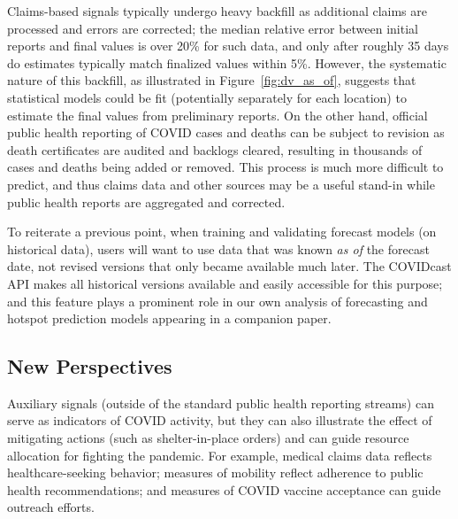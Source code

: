 \documentclass[9pt,twocolumn,twoside,lineno]{pnas-new}
\begin{document}
Claims-based signals typically undergo heavy backfill as additional claims are
processed and errors are corrected; the median relative error between initial
reports and final values is over 20\% for such data, and only after roughly 35
days do estimates typically match finalized values within 5\%. However, the
systematic nature of this backfill, as illustrated in Figure~\ref{fig:dv_as_of},
suggests that statistical models could be fit (potentially separately for each
location) to estimate the final values from preliminary reports. On the other
hand, official public health reporting of COVID cases and deaths can be subject
to revision as death certificates are audited and backlogs cleared, resulting in
thousands of cases and deaths being added or removed. This process is much more
difficult to predict, and thus claims data and other sources may be a useful
stand-in while public health reports are aggregated and corrected.

To reiterate a previous point, when training and validating forecast models (on
historical data), users will want to use data that was known \textit{as of} the
forecast date, not revised versions that only became available much later. The
COVIDcast API makes all historical versions available and easily accessible for
this purpose; and this feature plays a prominent role in our own analysis of
forecasting and hotspot prediction models appearing in a companion paper.

\subsection{New Perspectives}

Auxiliary signals (outside of the standard public health reporting streams) can
serve as indicators of COVID activity, but they can also illustrate the effect
of mitigating actions (such as shelter-in-place orders) and can guide resource 
allocation for fighting the pandemic. For example, medical claims data reflects
healthcare-seeking behavior; measures of mobility reflect adherence to public
health recommendations; and measures of COVID vaccine acceptance can guide
outreach efforts.
\end{document}
